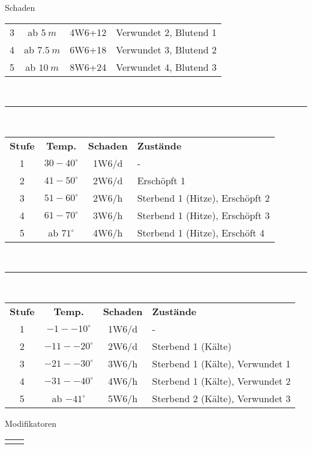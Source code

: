 \documentclass[a4paper, 11pt]{article}
\begin{document}
\begin{multicols}{3}
\begin{spmbox}{Schaden}
\begin{tabularx}{\linewidth}{c c c X}
            3 & ab $5~m$   & 4W6+12  & Verwundet 2, Blutend 1\\
            4 & ab $7.5~m$     & 6W6+18  & Verwundet 3, Blutend 2\\
            5 & ab $10~m$   & 8W6+24  & Verwundet 4, Blutend 3\\
        \end{tabularx}\\
        \rule{\linewidth}{.2em}\\
        \begin{tabularx}{\linewidth}{c c c X}
                \rowcolor{spmtabelle2}
                \textbf{Stufe} & \textbf{Temp.} & \textbf{Schaden} & \textbf{Zustände} \\
                1 & $30 - 40^\circ$ & 1W6/d & - \\
                2 & $41 - 50^\circ$ & 2W6/d & Erschöpft 1\\
                3 & $51 - 60^\circ$ & 2W6/h & Sterbend 1 (Hitze), Erschöpft 2\\
                4 & $61 - 70^\circ$ & 3W6/h & Sterbend 1 (Hitze), Erschöpft 3\\
                5 & ab $71^\circ$ & 4W6/h & Sterbend 1 (Hitze), Erschöft 4\\
        \end{tabularx}\\
        \rule{\linewidth}{.2em}\\
        \begin{tabularx}{\linewidth}{c c c X}
                \rowcolor{spmtabelle2}
                \textbf{Stufe} & \textbf{Temp.} & \textbf{Schaden} & \textbf{Zustände} \\
                1 & $-1 - -10^\circ$ & 1W6/d & - \\
                2 & $-11 - -20^\circ$ & 2W6/d & Sterbend 1 (Kälte)\\
                3 & $-21 - -30^\circ$ & 3W6/h & Sterbend 1 (Kälte), Verwundet 1\\
                4 & $-31 - -40^\circ$ & 4W6/h & Sterbend 1 (Kälte), Verwundet 2\\
                5 & ab $-41^\circ$ & 5W6/h & Sterbend 2 (Kälte), Verwundet 3\\
        \end{tabularx}
\end{spmbox}
\begin{spmbox}{Modifikatoren}
        \begin{tabularx}{\linewidth}{X X}
                \rowcolor{spmtabelle2}

\end{tabularx}
\end{spmbox}
\end{multicols}
\end{document}
